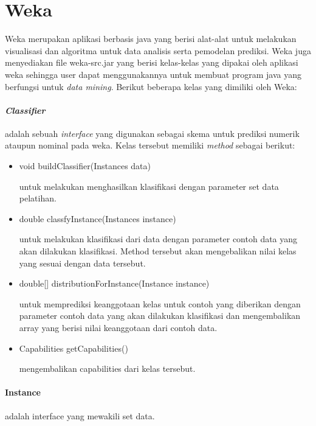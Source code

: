 \section{Weka}
Weka merupakan aplikasi berbasis java yang berisi alat-alat untuk melakukan visualisasi dan algoritma untuk data analisis serta pemodelan prediksi. Weka juga menyediakan file weka-src.jar yang berisi kelas-kelas yang dipakai oleh aplikasi weka sehingga user dapat menggunakannya untuk membuat program java yang berfungsi untuk \textsl{data mining}. Berikut beberapa kelas yang dimiliki oleh Weka:

\paragraph{\textsl{Classifier}} adalah sebuah \textsl{interface} yang digunakan sebagai skema untuk prediksi numerik ataupun nominal pada weka. Kelas tersebut memiliki \textsl{method} sebagai berikut:
\begin{itemize}
	
	\item void buildClassifier(Instances data)
	
	untuk melakukan menghasilkan klasifikasi dengan parameter set data pelatihan.
	
	\item double classfyInstance(Instances instance)
	
	untuk melakukan klasifikasi dari data dengan parameter contoh data yang akan dilakukan klasifikasi. Method tersebut akan mengebalikan nilai kelas yang sesuai dengan data tersebut.
	
	\item double[] distributionForInstance(Instance instance)
	
	untuk memprediksi keanggotaan kelas untuk contoh yang diberikan dengan parameter contoh data yang akan dilakukan klasifikasi dan mengembalikan array yang berisi nilai keanggotaan dari contoh data.
	
	\item Capabilities getCapabilities()
	
	mengembalikan capabilities dari kelas tersebut.
\end{itemize}

\paragraph{Instance} adalah interface yang mewakili set data.


